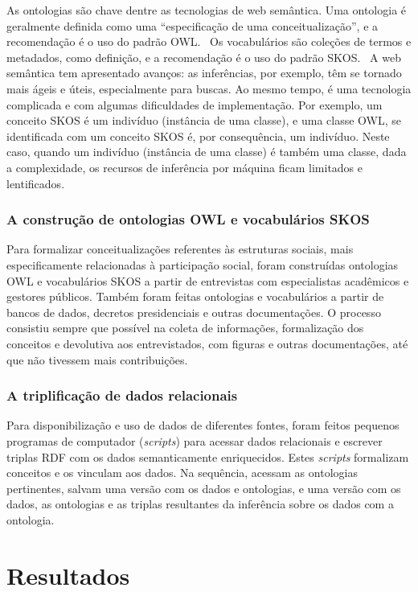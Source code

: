 \documentclass[a4paper,openright,12pt]{report} %
\begin{document}
As ontologias são chave dentre as tecnologias de web semântica.
Uma ontologia é geralmente definida como uma ``especificação de
uma conceitualização'', e a recomendação é o uso do padrão OWL.~\cite{owl}
Os vocabulários são coleções de termos e metadados, como definição,
e a recomendação é o uso do padrão SKOS.~\cite{skos}
A web semântica tem apresentado avanços:
as inferências, por exemplo, têm se tornado mais ágeis e úteis, especialmente para buscas.
Ao mesmo tempo, é uma tecnologia
complicada e com algumas dificuldades de implementação.
Por exemplo, um conceito SKOS é um indivíduo (instância de uma classe),
e uma classe OWL,
se identificada com um conceito SKOS é, por consequência, um
indivíduo.
Neste caso, quando um indivíduo (instância de uma classe) é
também uma classe, dada a complexidade, os recursos de inferência por máquina 
ficam limitados e lentificados.

\subsection{A construção de ontologias OWL e vocabulários SKOS}

Para formalizar conceitualizações referentes às estruturas sociais,
mais especificamente relacionadas à participação social,
foram construídas ontologias OWL e vocabulários SKOS a partir de entrevistas
com especialistas acadêmicos e gestores públicos.
Também foram feitas ontologias e vocabulários a partir de bancos de dados,
decretos presidenciais e outras documentações.
O processo  consistiu sempre que possível na coleta de informações,
formalização dos conceitos e devolutiva aos entrevistados,
com figuras e outras documentações, até que não tivessem
mais contribuições.~\cite{pnud5}

\subsection{A triplificação de dados relacionais}
Para disponibilização e uso de dados de diferentes fontes, foram
feitos pequenos programas de computador (\emph{scripts}) para
acessar dados relacionais e escrever triplas RDF com os dados semanticamente enriquecidos.
Estes \emph{scripts} formalizam conceitos e os vinculam aos dados.
Na sequência, acessam as ontologias pertinentes, salvam
uma versão com os dados e ontologias, e uma versão
com os dados, as ontologias e as triplas resultantes da inferência sobre os dados com a ontologia.


\chapter{Resultados}\label{sec:res}
\end{document}
